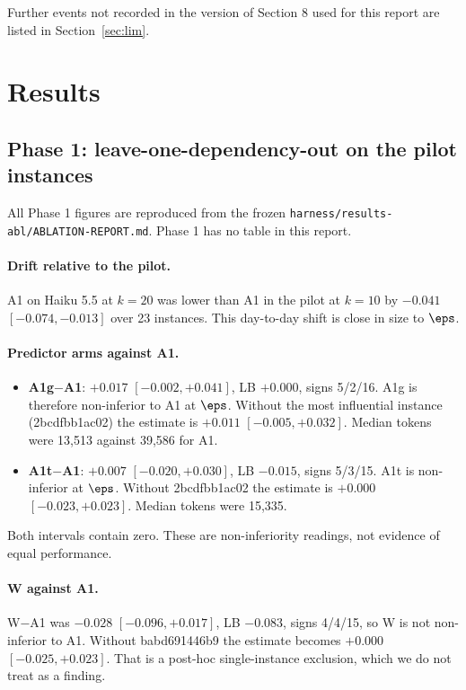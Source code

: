 Further events not recorded in the version of Section 8 used for this report are listed in Section~\ref{sec:lim}.

\section{Results}



\subsection{Phase 1: leave-one-dependency-out on the pilot instances}

All Phase 1 figures are reproduced from the frozen \texttt{harness/results-abl/ABLATION-REPORT.md}. Phase 1 has no table in this report.

\paragraph{Drift relative to the pilot.} A1 on Haiku 5.5 at $k=20$ was lower than A1 in the pilot at $k=10$ by $-0.041$ $[-0.074, -0.013]$ over 23 instances. This day-to-day shift is close in size to $\eps$.

\paragraph{Predictor arms against A1.}
\begin{itemize}
\item \textbf{A1g$-$A1}: $+0.017$ $[-0.002, +0.041]$, LB $+0.000$, signs 5/2/16. A1g is therefore non-inferior to A1 at $\eps$. Without the most influential instance (2bcdfbb1ac02) the estimate is $+0.011$ $[-0.005, +0.032]$. Median tokens were 13,513 against 39,586 for A1.
\item \textbf{A1t$-$A1}: $+0.007$ $[-0.020, +0.030]$, LB $-0.015$, signs 5/3/15. A1t is non-inferior at $\eps$. Without 2bcdfbb1ac02 the estimate is $+0.000$ $[-0.023, +0.023]$. Median tokens were 15,335.
\end{itemize}
Both intervals contain zero. These are non-inferiority readings, not evidence of equal performance.

\paragraph{W against A1.} W$-$A1 was $-0.028$ $[-0.096, +0.017]$, LB $-0.083$, signs 4/4/15, so W is not non-inferior to A1. Without babd691446b9 the estimate becomes $+0.000$ $[-0.025, +0.023]$. That is a post-hoc single-instance exclusion, which we do not treat as a finding.

